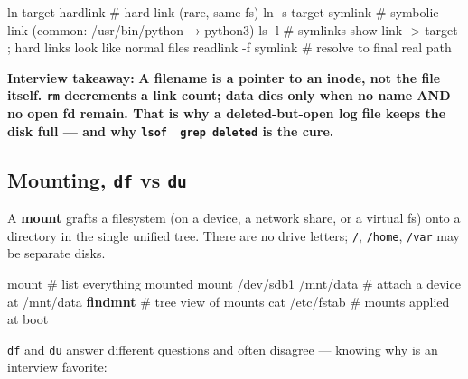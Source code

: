 \documentclass[11pt]{article}
\newenvironment{Shaded}{\begin{snugshade}}{\end{snugshade}}
\newcommand{\AttributeTok}[1]{\textcolor[rgb]{0.16,0.50,0.73}{#1}}
\newcommand{\CommentTok}[1]{\textcolor[rgb]{0.48,0.49,0.49}{#1}}
\newcommand{\ExtensionTok}[1]{\textcolor[rgb]{0.00,0.60,1.00}{\textbf{#1}}}
\newcommand{\FunctionTok}[1]{\textcolor[rgb]{0.56,0.27,0.68}{#1}}
\newcommand{\NormalTok}[1]{\textcolor[rgb]{0.81,0.81,0.76}{#1}}
\begin{document}

\begin{Shaded}
\begin{Highlighting}[]
\FunctionTok{ln}\NormalTok{  target hardlink         }\CommentTok{\# hard link (rare, same fs)}
\FunctionTok{ln} \AttributeTok{{-}s}\NormalTok{ target symlink        }\CommentTok{\# symbolic link (common: /usr/bin/python → python3)}
\FunctionTok{ls} \AttributeTok{{-}l}                       \CommentTok{\# symlinks show  link {-}\textgreater{} target ;  hard links look like normal files}
\FunctionTok{readlink} \AttributeTok{{-}f}\NormalTok{ symlink         }\CommentTok{\# resolve to final real path}
\end{Highlighting}
\end{Shaded}

\textbf{Interview takeaway:} \textbf{A filename is a pointer to an inode, not the file itself. \texttt{rm} decrements a link count; data dies only when no name AND no open fd remain. That is why a deleted-but-open log file keeps the disk full --- and why \texttt{lsof\ \textbar{}\ grep\ deleted} is the cure.}

\subsection{\texorpdfstring{Mounting, \texttt{df} vs \texttt{du}}{Mounting, df vs du}}\label{mounting-df-vs-du}

A \textbf{mount} grafts a filesystem (on a device, a network share, or a virtual fs) onto a directory in the single unified tree. There are no drive letters; \texttt{/}, \texttt{/home}, \texttt{/var} may be separate disks.


\begin{Shaded}
\begin{Highlighting}[]
\FunctionTok{mount}                       \CommentTok{\# list everything mounted}
\FunctionTok{mount}\NormalTok{ /dev/sdb1 /mnt/data   }\CommentTok{\# attach a device at /mnt/data}
\ExtensionTok{findmnt}                     \CommentTok{\# tree view of mounts}
\FunctionTok{cat}\NormalTok{ /etc/fstab              }\CommentTok{\# mounts applied at boot}
\end{Highlighting}
\end{Shaded}

\texttt{df} and \texttt{du} answer different questions and often disagree --- knowing why is an interview favorite:
\end{document}
